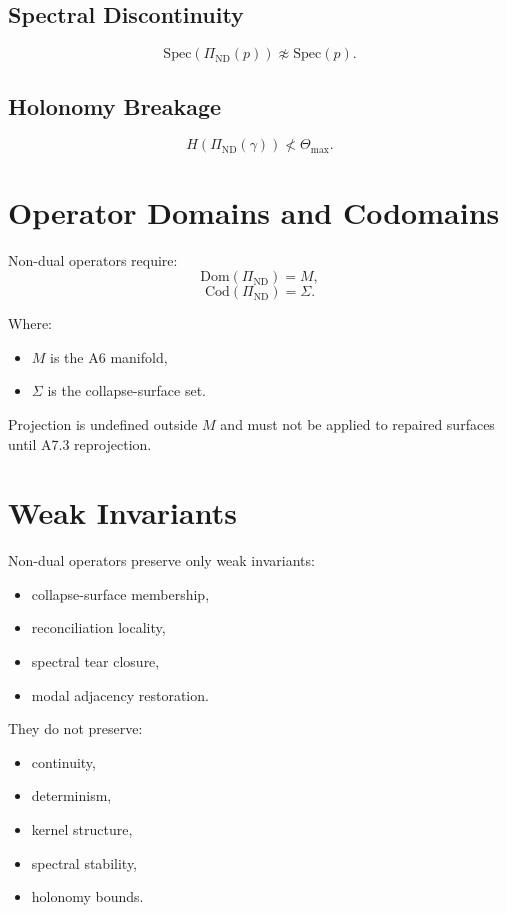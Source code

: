 \documentclass[11pt]{article}
\begin{document}
\subsection{Spectral Discontinuity}
\[
\mathrm{Spec}(\Pi_{\mathrm{ND}}(p)) \not\approx \mathrm{Spec}(p).
\]

\subsection{Holonomy Breakage}
\[
H(\Pi_{\mathrm{ND}}(\gamma)) \not< \Theta_{\max}.
\]

\section{Operator Domains and Codomains}

Non-dual operators require:
\[
\mathrm{Dom}(\Pi_{\mathrm{ND}}) = M,
\]
\[
\mathrm{Cod}(\Pi_{\mathrm{ND}}) = \Sigma.
\]

Where:
\begin{itemize}
  \item $M$ is the A6 manifold,
  \item $\Sigma$ is the collapse-surface set.
\end{itemize}

Projection is undefined outside $M$ and must not be applied to repaired
surfaces until A7.3 reprojection.

\section{Weak Invariants}

Non-dual operators preserve only weak invariants:
\begin{itemize}
  \item collapse-surface membership,
  \item reconciliation locality,
  \item spectral tear closure,
  \item modal adjacency restoration.
\end{itemize}

They do not preserve:
\begin{itemize}
  \item continuity,
  \item determinism,
  \item kernel structure,
  \item spectral stability,
  \item holonomy bounds.
\end{itemize}
\end{document}
